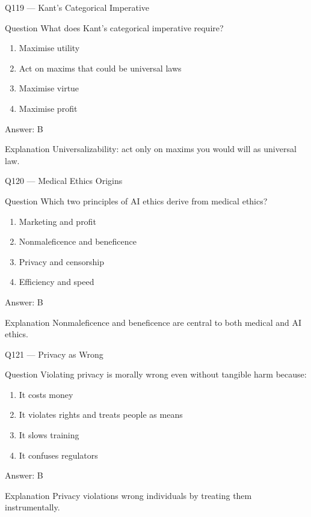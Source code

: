 \documentclass[aspectratio=169,8pt]{beamer}
\begin{document}
	\begin{frame}{Q119 --- Kant's Categorical Imperative}
		\begin{block}{Question}
			What does Kant's categorical imperative require?
		\end{block}
		\begin{enumerate}
			\item Maximise utility
			\item Act on maxims that could be universal laws
			\item Maximise virtue
			\item Maximise profit
		\end{enumerate}
		\begin{exampleblock}{Answer: B}\end{exampleblock}
		\begin{block}{Explanation}
			Universalizability: act only on maxims you would will as universal law.
		\end{block}
	\end{frame}
	
	\begin{frame}{Q120 --- Medical Ethics Origins}
		\begin{block}{Question}
			Which two principles of AI ethics derive from medical ethics?
		\end{block}
		\begin{enumerate}
			\item Marketing and profit
			\item Nonmaleficence and beneficence
			\item Privacy and censorship
			\item Efficiency and speed
		\end{enumerate}
		\begin{exampleblock}{Answer: B}\end{exampleblock}
		\begin{block}{Explanation}
			Nonmaleficence and beneficence are central to both medical and AI ethics.
		\end{block}
	\end{frame}
	
	\begin{frame}{Q121 --- Privacy as Wrong}
		\begin{block}{Question}
			Violating privacy is morally wrong even without tangible harm because:
		\end{block}
		\begin{enumerate}
			\item It costs money
			\item It violates rights and treats people as means
			\item It slows training
			\item It confuses regulators
		\end{enumerate}
		\begin{exampleblock}{Answer: B}\end{exampleblock}
		\begin{block}{Explanation}
			Privacy violations wrong individuals by treating them instrumentally.
		\end{block}
	\end{frame}
	
\end{document}
